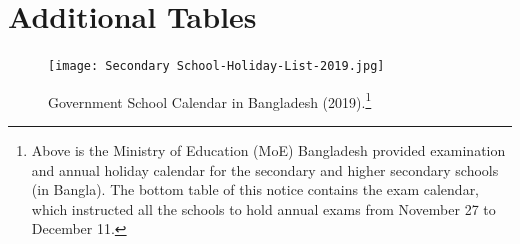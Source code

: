 \documentclass[12pt,letterpaper]{article}
\newcommand{\0}{\ensuremath{\mbox{\boldmath $0$}}}
\begin{document}
{\pagebreak


\section{Additional Tables\label{app_a4}}

\begin{figure}[ht!]
\centering
\texttt{[image: Secondary School-Holiday-List-2019.jpg]}\\
\caption{Government School Calendar in Bangladesh (2019).\footnote{Above is the Ministry of Education (MoE) Bangladesh provided examination and annual holiday calendar for the secondary and higher secondary schools (in Bangla). The bottom table of this notice contains the exam calendar, which instructed all the schools to hold annual exams from November 27 to December 11.}}
\label{school_calander_2019}
\end{figure}


\pagebreak

}
\end{document}
